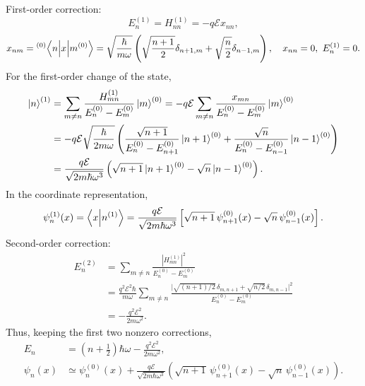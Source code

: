First-order correction:
\begin{equation}
 E_n^{(1)}=H_{nn}^{(1)}=-q\mathcal E x_{nn},
\end{equation}
\begin{equation}
 x_{nm}={}^{(0)}\!\left\langle n\middle|x\middle|m^{(0)}\right\rangle
 =\sqrt{\frac{\hbar}{m\omega}}
 \left(\sqrt{\frac{n+1}{2}}\delta_{n+1,m}
 +\sqrt{\frac n2}\delta_{n-1,m}\right),
 \quad x_{nn}=0,\ E_n^{(1)}=0.
\end{equation}
For the first-order change of the state,
\begin{equation}\begin{aligned}
 \left|n\right\rangle^{(1)}
 &=\sum_{m\ne n}\frac{H_{mn}^{(1)}}{E_n^{(0)}-E_m^{(0)}}\left|m\right\rangle^{(0)}
 =-q\mathcal E\sum_{m\ne n}\frac{x_{mn}}{E_n^{(0)}-E_m^{(0)}}\left|m\right\rangle^{(0)}\\
 &=-q\mathcal E\sqrt{\frac{\hbar}{2m\omega}}
 \left(\frac{\sqrt{n+1}}{E_n^{(0)}-E_{n+1}^{(0)}}\left|n+1\right\rangle^{(0)}
 +\frac{\sqrt n}{E_n^{(0)}-E_{n-1}^{(0)}}\left|n-1\right\rangle^{(0)}\right)\\
 &=\frac{q\mathcal E}{\sqrt{2m\hbar\omega^3}}
 \left(\sqrt{n+1}\left|n+1\right\rangle^{(0)}-\sqrt n\left|n-1\right\rangle^{(0)}\right).
\end{aligned}\end{equation}
In the coordinate representation,
\begin{equation}
 \psi_n^{(1)}(x)=\left\langle x\middle|n^{(1)}\right\rangle
 =\frac{q\mathcal E}{\sqrt{2m\hbar\omega^3}}
 \left[\sqrt{n+1}\,\psi_{n+1}^{(0)}(x)
 -\sqrt n\,\psi_{n-1}^{(0)}(x)\right].
\end{equation}
Second-order correction:
\begin{equation}\begin{aligned}
 E_n^{(2)}&=\sum_{m\ne n}\frac{|H_{mn}^{(1)}|^2}{E_n^{(0)}-E_m^{(0)}}\\
 &=\frac{q^2\mathcal E^2\hbar}{m\omega}
 \sum_{m\ne n}\frac{\bigl|\sqrt{(n+1)/2}\,\delta_{m,n+1}
 +\sqrt{n/2}\,\delta_{m,n-1}\bigr|^2}{E_n^{(0)}-E_m^{(0)}}\\
 &=-\frac{q^2\mathcal E^2}{2m\omega^2}.
\end{aligned}\end{equation}
Thus, keeping the first two nonzero corrections,
\begin{equation}
 \boxed{\begin{aligned}
 E_n&=\left(n+\frac12\right)\hbar\omega
 -\frac{q^2\mathcal E^2}{2m\omega^2},\\
 \psi_n(x)&\simeq\psi_n^{(0)}(x)
 +\frac{q\mathcal E}{\sqrt{2m\hbar\omega^3}}
 \left(\sqrt{n+1}\,\psi_{n+1}^{(0)}(x)
 -\sqrt n\,\psi_{n-1}^{(0)}(x)\right).
 \end{aligned}}
\end{equation}
